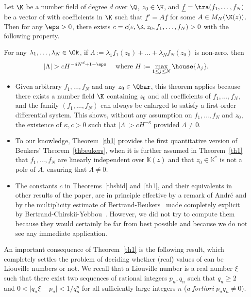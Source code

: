 \begin{theo} \label{th1}
Let $\K$ be a number field of degree $d$ over $\Q$,
$z_0\in\K$, and $\underline f = \tra (f_1,\ldots, f_N)$ be a vector of \Efunctions with coefficients in $\K$ such that $\underline f '=A\underline f $ for some $A\in M_N(\K(z))$. Then for any $\eps>0$, there exists $c=c(\varepsilon,\K,z_0,f_1,\ldots,f_N)>0$ with the following property.

For any $\lambda_1,\ldots, \lambda_N\in\Ok$, if $\Lambda := \lambda_1 f_1(z_0) + \ldots + \lambda_N f_N(z_0) $ is non-zero, then
\[
| \Lambda| > c H^{-d N^d+1-\eps} \quad \mbox{ where } H:=\max_{1\leq j \leq N}\house{\lambda_j}.
\]
\end{theo}

\skpt
\begin{Remarks*}
\begin{itemize}
\item
Given arbitrary \Efunctions $f_1,\ldots,f_N$ and any $z_0\in\Qbar$, this theorem applies because there exists a number field $\K$ containing $z_0$ and all coefficients of $f_1,\ldots,f_N$, and the family $(f_1,\ldots, f_N)$ can always be enlarged to satisfy a first-order differential system. This shows, without any assumption on $f_1,\ldots,f_N$ and $z_0$, the existence of $\kappa,c>0$ such that $| \Lambda| > c H^{-\kappa}$ provided $ \Lambda\neq 0$.

\item
To our knowledge, Theorem~\ref{th1} provides the first quantitative version of Beukers' Theorem~\ref{thbeukers}, when it is further assumed in Theorem~\ref{th1} that $f_1, \ldots, f_N$ are linearly independent over $\mathbb K(z)$ and that $z_0\in \mathbb K^*$ is not a pole of $A$, ensuring that $\Lambda\neq 0$.

\item
The constants $c$ in Theorems~\ref{thshid} and~\ref{th1}, and their equivalents in other results of the paper, are in principle effective by a remark of André \cite[footnote on p.\,129]{andrelivre} and by the multiplicity estimate of Bertrand-Beukers~\cite{bb} made completely explicit by
Bertrand-Chirskii-Yebbou~\cite{bcy}. However, we did not try to compute them because they would certainly be far from best possible and because we do not see any immediate application.
\end{itemize}
\end{Remarks*}

An important consequence of Theorem~\ref{th1} is the following result, which completely settles the problem of deciding whether (real) values of \Efunctions can be Liouville numbers or not. We recall that a Liouville number is a real number $\xi$ such that there exist two sequences of rational integers $p_n, q_n$ such that $q_n\ge 2$ and $0<\vert q_n\xi-p_n\vert<1/q_n^{ n}$ for all sufficiently large integers $n$ ({\em a fortiori} $p_nq_n\neq 0$).

